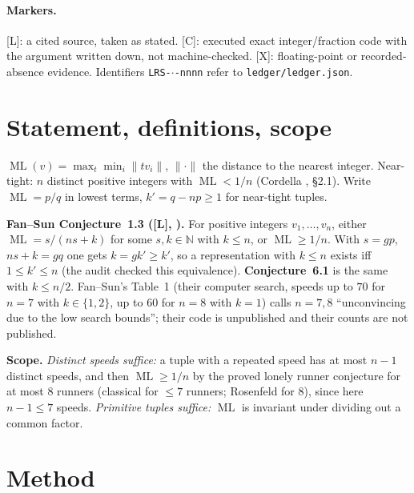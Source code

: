 \documentclass[10pt]{article}
\newcommand{\tier}[1]{\textsf{[#1]}}
\newcommand{\tL}{\tier{L}}
\newcommand{\tC}{\tier{C}}
\newcommand{\tX}{\tier{X}}
\newcommand{\ML}{\operatorname{ML}}
\begin{document}
\paragraph{Markers.} \tL{}: a cited source, taken as stated. \tC{}: executed exact integer/fraction code with the argument written down, not machine-checked. \tX{}: floating-point or recorded-absence evidence. Identifiers \texttt{LRS-$\cdot$-nnnn} refer to \texttt{ledger/ledger.json}.

\section{Statement, definitions, scope}\label{sec:stmt}
$\ML(v)=\max_t\min_i\|tv_i\|$, $\|\cdot\|$ the distance to the nearest integer. Near-tight: $n$ distinct positive integers with $\ML<1/n$ (Cordella \cite{cor}, \S2.1). Write $\ML=p/q$ in lowest terms, $k'=q-np\ge1$ for near-tight tuples.

\textbf{Fan--Sun Conjecture~1.3 (\tL{}, \cite{fs}).} For positive integers $v_1,\dots,v_n$, either $\ML=s/(ns+k)$ for some $s,k\in\mathbb N$ with $k\le n$, or $\ML\ge1/n$. With $s=gp$, $ns+k=gq$ one gets $k=gk'\ge k'$, so a representation with $k\le n$ exists iff $1\le k'\le n$ (the audit checked this equivalence). \textbf{Conjecture~6.1} is the same with $k\le n/2$. Fan--Sun's Table~1 (their computer search, speeds up to $70$ for $n=7$ with $k\in\{1,2\}$, up to $60$ for $n=8$ with $k=1$) calls $n=7,8$ ``unconvincing due to the low search bounds''; their code is unpublished and their counts are not published.

\textbf{Scope.} \emph{Distinct speeds suffice:} a tuple with a repeated speed has at most $n-1$ distinct speeds, and then $\ML\ge1/n$ by the proved lonely runner conjecture for at most $8$ runners (classical for $\le7$ runners; Rosenfeld \cite{ros} for $8$), since here $n-1\le7$ speeds. \emph{Primitive tuples suffice:} $\ML$ is invariant under dividing out a common factor.

\section{Method}\label{sec:method}
\end{document}
